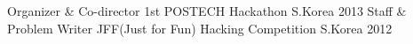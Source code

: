 \begin{cvhonors}
  \cvhonor
    {Organizer \& Co-director}
    {1st POSTECH Hackathon}
    {S.Korea}
    {2013}
  \cvhonor
    {Staff \& Problem Writer}
    {JFF(Just for Fun) Hacking Competition}
    {S.Korea}
    {2012}
\end{cvhonors}